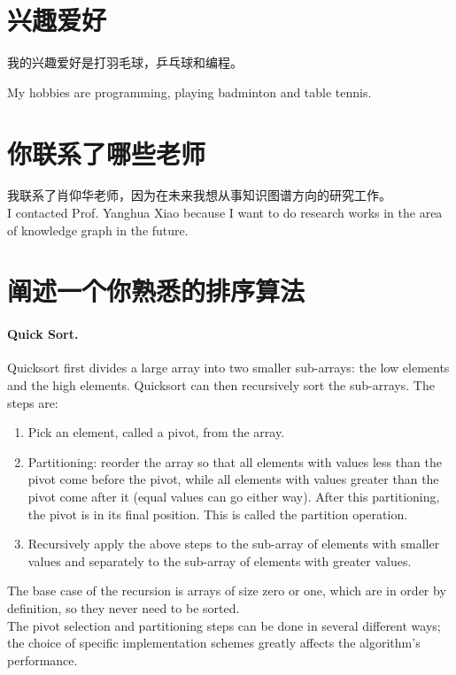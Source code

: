 \documentclass[letterpaper]{article}
\begin{document}
\section{兴趣爱好}
我的兴趣爱好是打羽毛球，乒乓球和编程。

My hobbies are programming, playing badminton and table tennis.

\section{你联系了哪些老师}
我联系了肖仰华老师，因为在未来我想从事知识图谱方向的研究工作。\\
I contacted Prof. Yanghua Xiao because I want to do research works in the area of knowledge graph in the future.

\section{阐述一个你熟悉的排序算法}
\paragraph{Quick Sort.}
 Quicksort first divides a large array into two smaller sub-arrays: the low elements and the high elements. Quicksort can then recursively sort the sub-arrays.
 The steps are:
 \begin{enumerate}
 	\item Pick an element, called a pivot, from the array.
 	\item Partitioning: reorder the array so that all elements with values less than the pivot come before the pivot, while all elements with values greater than the pivot come after it (equal values can go either way). After this partitioning, the pivot is in its final position. This is called the partition operation.
	\item Recursively apply the above steps to the sub-array of elements with smaller values and separately to the sub-array of elements with greater values.
 \end{enumerate}
The base case of the recursion is arrays of size zero or one, which are in order by definition, so they never need to be sorted.\\
The pivot selection and partitioning steps can be done in several different ways; the choice of specific implementation schemes greatly affects the algorithm's performance.
\end{document}
